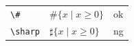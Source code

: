\documentclass[preview]{standalone}
\newcommand{\tA}[1]{\textcolor{cA}{#1}}
\newcommand{\tD}[1]{\textcolor{cD}{#1}}
\begin{document}
\begin{table}[h]
	\centering
	\begin{tabular}{lll}
		\verb|\#|     & $\#\{ x \mid x \geq 0 \}$                      & \tA{ok} \\
		\verb|\sharp| & \hspace{0.11em} $\sharp \{ x \mid x \geq 0 \}$ & \tD{ng} \\
	\end{tabular}
\end{table}
\end{document}
